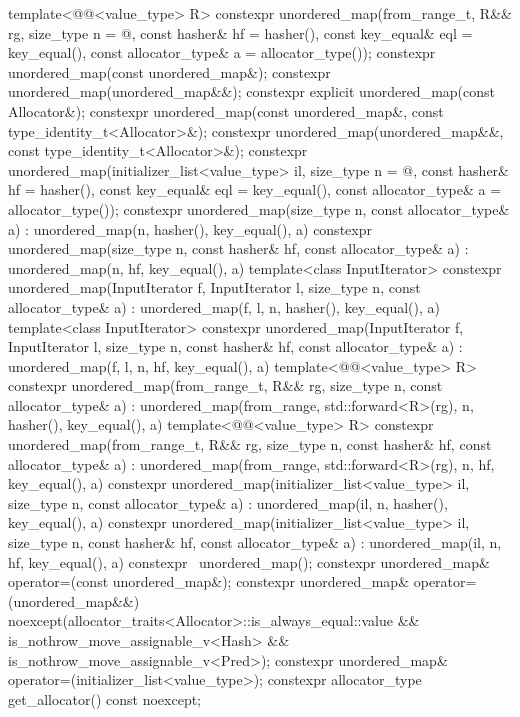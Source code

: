 \begin{codeblock}
{{    template<@@<value_type> R>
      constexpr unordered_map(from_range_t, R&& rg, size_type n = @\seebelow@,
                              const hasher& hf = hasher(), const key_equal& eql = key_equal(),
                              const allocator_type& a = allocator_type());
    constexpr unordered_map(const unordered_map&);
    constexpr unordered_map(unordered_map&&);
    constexpr explicit unordered_map(const Allocator&);
    constexpr unordered_map(const unordered_map&, const type_identity_t<Allocator>&);
    constexpr unordered_map(unordered_map&&, const type_identity_t<Allocator>&);
    constexpr unordered_map(initializer_list<value_type> il, size_type n = @\seebelow@,
                            const hasher& hf = hasher(),
                            const key_equal& eql = key_equal(),
                            const allocator_type& a = allocator_type());
    constexpr unordered_map(size_type n, const allocator_type& a)
      : unordered_map(n, hasher(), key_equal(), a) { }
    constexpr unordered_map(size_type n, const hasher& hf, const allocator_type& a)
      : unordered_map(n, hf, key_equal(), a) { }
    template<class InputIterator>
      constexpr unordered_map(InputIterator f, InputIterator l, size_type n,
                              const allocator_type& a)
        : unordered_map(f, l, n, hasher(), key_equal(), a) { }
    template<class InputIterator>
      constexpr unordered_map(InputIterator f, InputIterator l, size_type n, const hasher& hf,
                              const allocator_type& a)
        : unordered_map(f, l, n, hf, key_equal(), a) { }
    template<@@<value_type> R>
      constexpr unordered_map(from_range_t, R&& rg, size_type n, const allocator_type& a)
        : unordered_map(from_range, std::forward<R>(rg), n, hasher(), key_equal(), a) { }
    template<@@<value_type> R>
      constexpr unordered_map(from_range_t, R&& rg, size_type n, const hasher& hf,
                              const allocator_type& a)
        : unordered_map(from_range, std::forward<R>(rg), n, hf, key_equal(), a) { }
    constexpr unordered_map(initializer_list<value_type> il, size_type n,
                            const allocator_type& a)
      : unordered_map(il, n, hasher(), key_equal(), a) { }
    constexpr unordered_map(initializer_list<value_type> il, size_type n, const hasher& hf,
                            const allocator_type& a)
      : unordered_map(il, n, hf, key_equal(), a) { }
    constexpr ~unordered_map();
    constexpr unordered_map& operator=(const unordered_map&);
    constexpr unordered_map& operator=(unordered_map&&)
      noexcept(allocator_traits<Allocator>::is_always_equal::value &&
               is_nothrow_move_assignable_v<Hash> &&
               is_nothrow_move_assignable_v<Pred>);
    constexpr unordered_map& operator=(initializer_list<value_type>);
    constexpr allocator_type get_allocator() const noexcept;

}}
\end{codeblock}
